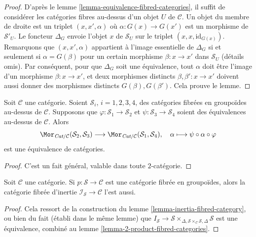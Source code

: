 \begin{proof}
D'après le
lemme \ref{lemma-equivalence-fibred-categories},
il suffit de considérer les catégories fibres au-dessus d'un objet $U$ de $\mathcal{C}$.
Un objet du membre de droite est un triplet $(x, x', \alpha)$ où
$\alpha : G(x) \to G(x')$ est un morphisme de $\mathcal{S}'_U$.
Le foncteur $\Delta_G$ envoie l'objet $x$ de $\mathcal{S}_U$
sur le triplet $(x, x, \text{id}_{G(x)})$. Remarquons que $(x, x', \alpha)$
appartient à l'image essentielle de $\Delta_G$ si et seulement si $\alpha = G(\beta)$
pour un certain morphisme $\beta : x \to x'$ dans $\mathcal{S}_U$ (détails omis).
Par conséquent, pour que $\Delta_G$ soit une équivalence, tout $\alpha$ doit
être l'image d'un morphisme $\beta : x \to x'$, et deux morphismes
distincts $\beta, \beta' : x \to x'$ doivent aussi donner des morphismes distincts
$G(\beta), G(\beta')$. Cela prouve le lemme.
\end{proof}

\begin{lemma}
\label{lemma-morphisms-equivalent-fibred-groupoids}
Soit $\mathcal{C}$ une catégorie.
Soient $\mathcal{S}_i$, $i = 1, 2, 3, 4$, des catégories fibrées en
groupoïdes au-dessus de $\mathcal{C}$.
Supposons que $\varphi : \mathcal{S}_1 \to \mathcal{S}_2$ et
$\psi : \mathcal{S}_3 \to \mathcal{S}_4$ soient des équivalences
au-dessus de $\mathcal{C}$. Alors
$$
\Mor_{\textit{Cat}/\mathcal{C}}(\mathcal{S}_2, \mathcal{S}_3)
\longrightarrow
\Mor_{\textit{Cat}/\mathcal{C}}(\mathcal{S}_1, \mathcal{S}_4),
\quad \alpha \longmapsto \psi \circ \alpha \circ \varphi
$$
est une équivalence de catégories.
\end{lemma}

\begin{proof}
C'est un fait général, valable dans toute $2$-catégorie.
\end{proof}

\begin{lemma}
\label{lemma-inertia-fibred-groupoids}
Soit $\mathcal{C}$ une catégorie.
Si $p : \mathcal{S} \to \mathcal{C}$ est une catégorie fibrée en groupoïdes, alors
la catégorie fibrée d'inertie $\mathcal{I}_\mathcal{S} \to \mathcal{C}$ l'est aussi.
\end{lemma}

\begin{proof}
Cela ressort de la construction du
lemme \ref{lemma-inertia-fibred-category},
ou bien du fait (établi dans le même lemme) que
$I_\mathcal{S} \to \mathcal{S}
\times_{\Delta, \mathcal{S} \times_\mathcal{C} \mathcal{S}, \Delta}\mathcal{S}$
est une équivalence, combiné au
lemme \ref{lemma-2-product-fibred-categories}.
\end{proof}

